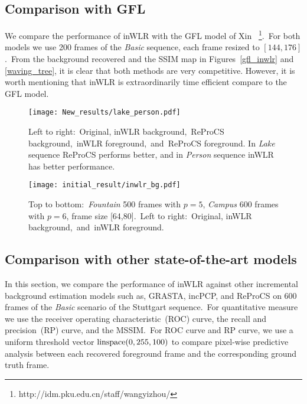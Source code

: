 \documentclass[10pt,twocolumn,letterpaper]{article}
\begin{document}
\subsection{Comparison with GFL}
\vspace{-0.0in}
We compare the performance of inWLR with the GFL
model of Xin
\etal~\cite{xin2015}\footnote{http://idm.pku.edu.cn/staff/wangyizhou/}.~For both models we use 200 frames of the {\it Basic} sequence, each
frame resized to $[144,176]$.~From the background recovered and the
SSIM map in Figures~\ref{gfl_inwlr} and \ref{waving_tree}, it is
clear that both methods are very competitive. However, it is worth
mentioning that inWLR is extraordinarily time efficient compare to
the GFL model.
\begin{figure}
    \centering
    \texttt{[image: New\_results/lake\_person.pdf]}
    \caption{Left to right:~Original, inWLR background,~ReProCS background,~inWLR foreground,~and~ReProCS foreground. In {\it Lake} sequence ReProCS performs better, and in {\it Person} sequence inWLR has better performance.}
    \label{lake_person}
\end{figure}
\begin{figure}
    \centering
    \texttt{[image: initial\_result/inwlr\_bg.pdf]}
    \caption{Top to bottom:~{\it Fountain} 500 frames with $p=5$, {\it Campus} 600 frames with $p=6$, frame size [64,80].~Left to right:~Original, inWLR background,~and~inWLR foreground.}
    \label{inwlr_bg}
\end{figure}
\vspace{-0.0in}

\vspace{-0.0in}
\subsection{Comparison with other state-of-the-art models}
\vspace{-0.00in}
In this section, we compare the performance of inWLR against other incremental background estimation models such as, GRASTA, incPCP, and ReProCS on 600 frames of the {\it Basic} scenario of the Stuttgart sequence.~For quantitative measure we use the receiver operating characteristic~(ROC) curve, the recall and precision~(RP) curve, and the MSSIM.~For ROC curve and RP curve, we use a uniform threshold vector ${\rm linspace}(0, 255,100)$ to compare pixel-wise predictive analysis between each recovered foreground frame and the corresponding ground truth frame.
\end{document}
